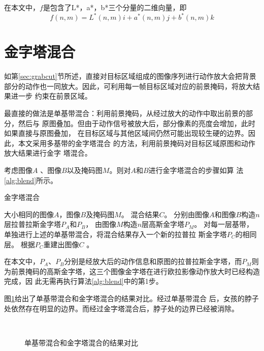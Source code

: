 在本文中，$f$是包含了L*，a*，b*三个分量的二维向量，即
\begin{equation}
  \label{eq:quaternion-lab}
  f(n,m)=L^{*}(n,m)i+a^{*}(n,m)j+b^{*}(n,m)k
\end{equation}

\section{金字塔混合}
\label{sec:pyramid-blending}

如第\ref{sec:grabcut}节所述，直接对目标区域组成的图像序列进行动作放大会把背景
部分的动作也一同放大。因此，可利用每一帧目标区域对应的前景掩码，将放大结果进一步
约束在前景区域。

最直接的做法是单基带混合：利用前景掩码，从经过放大的动作中取出前景的部分，然后与
原图叠加。但由于动作信号被放大后，部分像素的亮度会增加，此时如果直接与原图叠加，
在目标区域与其他区域间仍然可能出现较生硬的边界。因此，本文采用多基带的金字塔混合
的方法，利用前景掩码对目标区域原图和动作放大结果进行金字
塔混合。

考虑图像$A$ 、图像$B$以及掩码图$M$。则对$A$和$B$进行金字塔混合的步骤如算
法\ref{alg:blend}所示。

\begin{algorithm}[htbp]
  \caption{金字塔混合}
  \label{alg:blend}
  \begin{algorithmic}[1]
    \REQUIRE 大小相同的图像$A$，图像$B$及掩码图$M$。
    \ENSURE 混合结果$C$。
    \STATE 分别由图像$A$和图像$B$构造$n$层拉普拉斯金字塔$P_A$和$P_B$，
    由图像$M$构造$n$层高斯金字塔$P_M$。
    \STATE 对每一层基带，单独进行上述的单基带混合，将混合结果存入一个新的拉普拉
    斯金字塔$P_C$的相同层。
    \STATE 根据$P_C$重建出图像$C$ 。
  \end{algorithmic}
\end{algorithm}

在本文中，$P_A$、$P_B$分别是经放大后的动作信息和原图的拉普拉斯金字塔，而$P_M$则
为前景掩码的高斯金字塔，这三个图像金字塔在进行欧拉影像动作放大时已经构造完成，因
此无需再执行算法\ref{alg:blend}中的第1步。

图\ref{fig:blend-compare}给出了单基带混合和金字塔混合的结果对比。经过单基带混合
后，女孩的脖子处依然存在明显的边界。而经过金字塔混合后，脖子处的边界已经被消除。

\begin{figure}[htbp]
  \centering
  \\
  \caption{单基带混合和金字塔混合的结果对比}
  \label{fig:blend-compare}
\end{figure}


